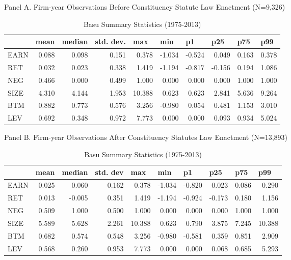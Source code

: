 \begin{table}[H]
	\centering
	\caption{Basu Summary Statistics (1975-2013)}
	Panel A. Firm-year Observations Before Constituency Statute Law Enactment (N=9,326)
	\begin{tabular}{lrrrrrrrrr}
		\toprule
		\toprule
		& \multicolumn{1}{l}{mean} & \multicolumn{1}{l}{median} & \multicolumn{1}{l}{std. dev.} & \multicolumn{1}{l}{max} & \multicolumn{1}{l}{min} & \multicolumn{1}{l}{p1} & \multicolumn{1}{l}{p25} & \multicolumn{1}{l}{p75} & \multicolumn{1}{l}{p99} \\
		\midrule
		EARN  & 0.088 & 0.098 & 0.151 & 0.378 & -1.034 & -0.524 & 0.049 & 0.163 & 0.378 \\
		RET   & 0.032 & 0.023 & 0.338 & 1.419 & -1.194 & -0.817 & -0.156 & 0.194 & 1.086 \\
		NEG   & 0.466 & 0.000 & 0.499 & 1.000 & 0.000 & 0.000 & 0.000 & 1.000 & 1.000 \\
		SIZE  & 4.310 & 4.144 & 1.953 & 10.388 & 0.623 & 0.623 & 2.841 & 5.636 & 9.264 \\
		BTM   & 0.882 & 0.773 & 0.576 & 3.256 & -0.980 & 0.054 & 0.481 & 1.153 & 3.010 \\
		LEV   & 0.692 & 0.348 & 0.972 & 7.773 & 0.000 & 0.000 & 0.093 & 0.934 & 5.024 \\
		\bottomrule
		\bottomrule
	\end{tabular}%
	\bigbreak
	Panel B. Firm-year Observations After Constituency Statutes Law Enactment (N=13,893)
	\begin{tabular}{lrrrrrrrrr}
		\toprule
		\toprule
		& \multicolumn{1}{l}{mean} & \multicolumn{1}{l}{median} & \multicolumn{1}{l}{std. dev} & \multicolumn{1}{l}{max} & \multicolumn{1}{l}{min} & \multicolumn{1}{l}{p1} & \multicolumn{1}{l}{p25} & \multicolumn{1}{l}{p75} & \multicolumn{1}{l}{p99} \\
		\midrule
		EARN  & 0.025 & 0.060 & 0.162 & 0.378 & -1.034 & -0.820 & 0.023 & 0.086 & 0.290 \\
		RET   & 0.013 & -0.005 & 0.351 & 1.419 & -1.194 & -0.924 & -0.173 & 0.180 & 1.156 \\
		NEG   & 0.509 & 1.000 & 0.500 & 1.000 & 0.000 & 0.000 & 0.000 & 1.000 & 1.000 \\
		SIZE  & 5.589 & 5.628 & 2.261 & 10.388 & 0.623 & 0.790 & 3.875 & 7.245 & 10.388 \\
		BTM   & 0.682 & 0.574 & 0.548 & 3.256 & -0.980 & -0.581 & 0.359 & 0.851 & 2.909 \\
		LEV   & 0.568 & 0.260 & 0.953 & 7.773 & 0.000 & 0.000 & 0.068 & 0.685 & 5.293 \\

\end{tabular}
\end{table}
